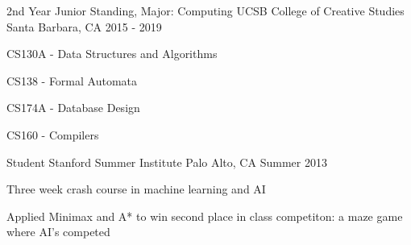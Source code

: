 \begin{cventries}
  \cventry
    {2nd Year Junior Standing, Major: Computing}
    {UCSB College of Creative Studies}
    {Santa Barbara, CA}
    {2015 - 2019}
    {
      \begin{cvitems}
        \item CS130A - Data Structures and Algorithms
        \item CS138 - Formal Automata
        \item CS174A - Database Design
        \item CS160 - Compilers
      \end{cvitems}
    }
  \cventry
    {Student}
    {Stanford Summer Institute}
    {Palo Alto, CA}
    {Summer 2013}
    {
      \begin{cvitems}
        \item {Three week crash course in machine learning and AI}
        \item {Applied Minimax and A* to win second place in class competiton: a maze game where AI's competed}
      \end{cvitems}
    }
\end{cventries}
